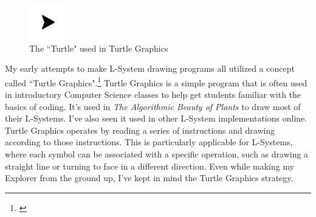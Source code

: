 \documentclass[12pt,twoside]{reedthesis}
\begin{document}
	\begin{figure}[H]
	\centering
	\includegraphics[scale = 3]{Images/Turtle}
	\caption{The ``Turtle" used in Turtle Graphics}
	\label {Turtle}
	\end{figure}

	My early attempts to make L-System drawing programs all utilized a concept called ``Turtle Graphics".\footnote{\cite{papert1980}} Turtle Graphics is a simple program that is often used in introductory Computer Science classes to help get students familiar with the basics of coding. It's used in \textit{The Algorithmic Beauty of Plants} to draw most of their L-Systems. I've also seen it used in other L-System implementations online. Turtle Graphics operates by reading a series of instructions and drawing according to those instructions. This is particularly applicable for L-Systems, where each symbol can be associated with a specific operation, such as drawing a straight line or turning to face in a different direction. Even while making my Explorer from the ground up, I've kept in mind the Turtle Graphics strategy.
	
\end{document}
